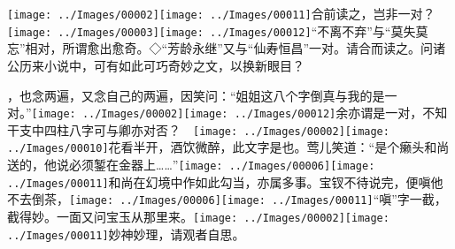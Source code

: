 

%
%
%
%
%

{{\texttt{[image: ../Images/00002]}\texttt{[image: ../Images/00011]}\footnotesize \kaishu 合前读之，岂非一对？　}\texttt{[image: ../Images/00003]}\texttt{[image: ../Images/00012]}\footnotesize \kaishu ``不离不弃''与``莫失莫忘''相对，所谓愈出愈奇。◇``芳龄永继''又与``仙寿恒昌''一对。请合而读之。问诸公历来小说中，可有如此可巧奇妙之文，以换新眼目？}

，也念两遍，又念自己的两遍，因笑问：``姐姐这八个字倒真与我的是一对。''{\texttt{[image: ../Images/00002]}\texttt{[image: ../Images/00012]}\footnotesize \kaishu 余亦谓是一对，不知干支中四柱八字可与卿亦对否？　\texttt{[image: ../Images/00002]}\texttt{[image: ../Images/00010]}\footnotesize \kaishu 花看半开，酒饮微醉，此文字是也。}莺儿笑道：``是个癞头和尚送的，他说必须錾在金器上\ldots{}\ldots{}''{\texttt{[image: ../Images/00006]}\texttt{[image: ../Images/00011]}\footnotesize \kaishu 和尚在幻境中作如此勾当，亦属多事。}宝钗不待说完，便嗔他不去倒茶，{\texttt{[image: ../Images/00006]}\texttt{[image: ../Images/00011]}\footnotesize \kaishu ``嗔''字一截，截得妙。}一面又问宝玉从那里来。{\texttt{[image: ../Images/00002]}\texttt{[image: ../Images/00011]}\footnotesize \kaishu 妙神妙理，请观者自思。}

